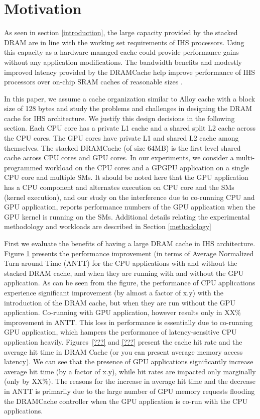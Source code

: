 \section{Motivation} \label{motivation}
As seen in section \ref{introduction}, the large capacity provided by the stacked DRAM are in line with the working set requirements of IHS processors. Using this capacity as a hardware managed cache could provide performance gains without any application modifications. The bandwidth benefits and modestly improved latency provided by the DRAMCache help improve performance of IHS processors over on-chip SRAM caches of reasonable sizes \cite{amd-exascale1}. 

In this paper, we assume a cache organization similar to Alloy cache \cite{alloy} with a block size of 128 bytes and study the problems and challenges in designing the DRAM cache for IHS architecture. We justify this design decisions in the following section. 
Each CPU core has a private L1 cache and a shared split L2 cache across the CPU cores. The GPU cores have private L1 and shared L2 cache among themselves.  
The stacked DRAMCache (of size 64MB) is the first level shared cache across CPU cores and GPU cores. In our experiments, we consider a multi-programmed workload on the CPU cores and a GPGPU application on a single CPU core and multiple SMs. It should be noted here that the GPU application has a CPU component and alternates execution on CPU core and the SMs (kernel execution), and our study on the interference due to co-running CPU and GPU application, reports performance numbers of the GPU application when the GPU kernel is running on the SMs.  
Additional details relating the experimental methodology and workloads are described in Section \ref{methodology}

First we evaluate the benefits of having a large DRAM cache in IHS architecture. Figure \ref{motivation} presents the performance
improvement (in terms of Average Normalized Turn-around Time (ANTT) \cite{antt} for the CPU applications with and without
the stacked DRAM cache, and when they are running with and without the GPU application. As can be seen from the figure,
the performance of CPU applications experience significant improvement (by almost a factor of x.y) with the introduction 
of the DRAM cache, but when they are run without the GPU application. Co-running with GPU application, however results
only in XX\% improvement in ANTT. This loss in performance is essentially due to co-running GPU application, which hampers 
the performance of latency-sensitive CPU application heavily. Figures~\ref{???} and \ref{???} present the cache hit rate
and the average hit time in DRAM Cache (or you can present average memory access latency).  We can see that the presence
of GPU applications significantly increase average hit time (by a factor of x.y), while hit rates are impacted only marginally 
(only by XX\%). The reasons for the increase in average hit time and the decrease in ANTT is primarily due to the large
number of GPU memory requests flooding the DRAMCache controller when the GPU application is co-run with the CPU applications.

